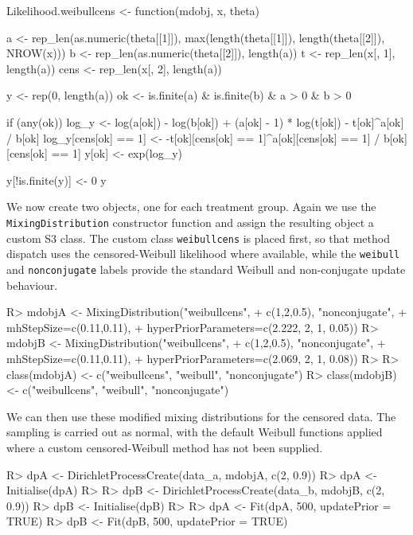 \documentclass[nojss]{jss}
\begin{document}
\begin{CodeInput}
Likelihood.weibullcens <- function(mdobj, x, theta) {
  a <- rep_len(as.numeric(theta[[1]]), max(length(theta[[1]]), length(theta[[2]]), NROW(x)))
  b <- rep_len(as.numeric(theta[[2]]), length(a))
  t <- rep_len(x[, 1], length(a))
  cens <- rep_len(x[, 2], length(a))

  y <- rep(0, length(a))
  ok <- is.finite(a) & is.finite(b) & a > 0 & b > 0

  if (any(ok)) {
    log_y <- log(a[ok]) - log(b[ok]) + (a[ok] - 1) * log(t[ok]) - t[ok]^a[ok] / b[ok]
    log_y[cens[ok] == 1] <- -t[ok][cens[ok] == 1]^a[ok][cens[ok] == 1] / b[ok][cens[ok] == 1]
    y[ok] <- exp(log_y)
  }

  y[!is.finite(y)] <- 0
  y
}
\end{CodeInput}

We now create two  objects, one for each treatment group. Again we use the \texttt{MixingDistribution} constructor function and assign the resulting object a custom S3 class. The custom class \texttt{weibullcens} is placed first, so that method dispatch uses the censored-Weibull likelihood where available, while the \texttt{weibull} and \texttt{nonconjugate} labels provide the standard Weibull and non-conjugate update behaviour.

\begin{CodeInput}
R> mdobjA <- MixingDistribution("weibullcens",
+                              c(1,2,0.5), "nonconjugate",
+                              mhStepSize=c(0.11,0.11),
+                              hyperPriorParameters=c(2.222, 2, 1, 0.05))
R> mdobjB <- MixingDistribution("weibullcens",
+                              c(1,2,0.5), "nonconjugate",
+                              mhStepSize=c(0.11,0.11),
+                              hyperPriorParameters=c(2.069, 2, 1, 0.08))
R>
R> class(mdobjA) <- c("weibullcens", "weibull", "nonconjugate")
R> class(mdobjB) <- c("weibullcens", "weibull", "nonconjugate")
\end{CodeInput}
We can then use these modified mixing distributions for the censored data. The sampling is carried out as normal, with the default Weibull functions applied where a custom censored-Weibull method has not been supplied.
\begin{CodeInput}
R> dpA <- DirichletProcessCreate(data_a, mdobjA, c(2, 0.9))
R> dpA <- Initialise(dpA)
R>
R> dpB <- DirichletProcessCreate(data_b, mdobjB, c(2, 0.9))
R> dpB <- Initialise(dpB)
R>
R> dpA <- Fit(dpA, 500, updatePrior = TRUE)
R> dpB <- Fit(dpB, 500, updatePrior = TRUE)
\end{CodeInput}
\end{document}
